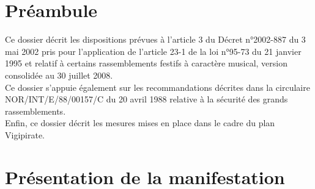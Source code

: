 \documentclass[hidelinks, paper=a4, fontsize=13pt]{report}
\begin{document}
\tableofcontents
\label{table_matiere}
\newpage
\section{Préambule}

Ce dossier décrit les dispositions prévues à l’article 3 du Décret n°2002-887 du 3 mai 2002 pris pour l’application de l’article 23-1 de la loi n°95-73 du 21 janvier 1995 et relatif à certains rassemblements festifs à caractère musical, version consolidée au 30 juillet 2008.\\

Ce dossier s’appuie également sur les recommandations décrites dans la circulaire NOR/INT/E/88/00157/C du 20 avril 1988 relative à la sécurité des grands rassemblements. \\

Enfin, ce dossier décrit les mesures mises en place dans le cadre du plan Vigipirate.

\newpage

\section{Présentation de la manifestation}
\end{document}
